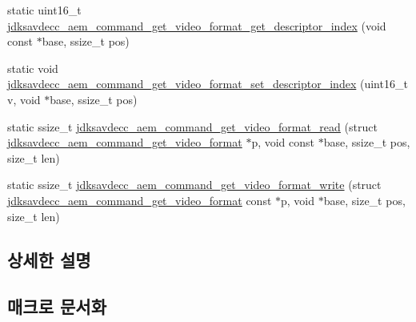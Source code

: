 \begin{DoxyCompactItemize}
\item 
static uint16\+\_\+t \hyperlink{group__command__get__video__format_gabae382d90ecc9e5fe7929895de0fe117}{jdksavdecc\+\_\+aem\+\_\+command\+\_\+get\+\_\+video\+\_\+format\+\_\+get\+\_\+descriptor\+\_\+index} (void const $\ast$base, ssize\+\_\+t pos)
\item 
static void \hyperlink{group__command__get__video__format_ga9fe421bf67bc59e63efd1517efd374a9}{jdksavdecc\+\_\+aem\+\_\+command\+\_\+get\+\_\+video\+\_\+format\+\_\+set\+\_\+descriptor\+\_\+index} (uint16\+\_\+t v, void $\ast$base, ssize\+\_\+t pos)
\item 
static ssize\+\_\+t \hyperlink{group__command__get__video__format_ga7f58e49fc65eb858993b15e278a5d55d}{jdksavdecc\+\_\+aem\+\_\+command\+\_\+get\+\_\+video\+\_\+format\+\_\+read} (struct \hyperlink{structjdksavdecc__aem__command__get__video__format}{jdksavdecc\+\_\+aem\+\_\+command\+\_\+get\+\_\+video\+\_\+format} $\ast$p, void const $\ast$base, ssize\+\_\+t pos, size\+\_\+t len)
\item 
static ssize\+\_\+t \hyperlink{group__command__get__video__format_ga06d1b66e8cefcd1a4febd23996bcee15}{jdksavdecc\+\_\+aem\+\_\+command\+\_\+get\+\_\+video\+\_\+format\+\_\+write} (struct \hyperlink{structjdksavdecc__aem__command__get__video__format}{jdksavdecc\+\_\+aem\+\_\+command\+\_\+get\+\_\+video\+\_\+format} const $\ast$p, void $\ast$base, size\+\_\+t pos, size\+\_\+t len)
\end{DoxyCompactItemize}


\subsection{상세한 설명}


\subsection{매크로 문서화}
